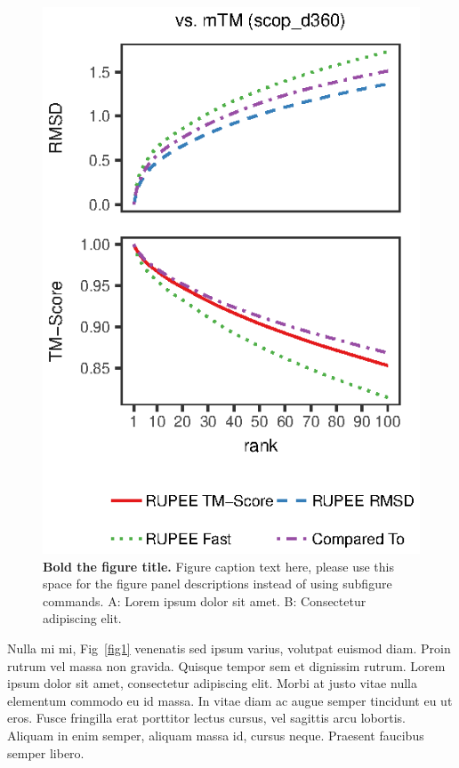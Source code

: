 \documentclass[10pt,letterpaper]{article}
\begin{document}
\begin{figure}[!h]
\includegraphics{Fig5}
\caption{{\bf Bold the figure title.}
Figure caption text here, please use this space for the figure panel descriptions instead of using subfigure commands. A: Lorem ipsum dolor sit amet. B: Consectetur adipiscing elit.}
\label{fig5}
\end{figure}

Nulla mi mi, Fig~\ref{fig1} venenatis sed ipsum varius, volutpat euismod diam. Proin rutrum vel massa non gravida. Quisque tempor sem et dignissim rutrum. Lorem ipsum dolor sit amet, consectetur adipiscing elit. Morbi at justo vitae nulla elementum commodo eu id massa. In vitae diam ac augue semper tincidunt eu ut eros. Fusce fringilla erat porttitor lectus cursus,  vel sagittis arcu lobortis. Aliquam in enim semper, aliquam massa id, cursus neque. Praesent faucibus semper libero.
\end{document}
